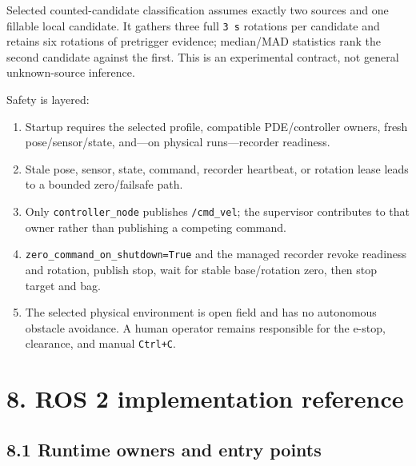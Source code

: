 \documentclass[
  10pt,
  letterpaper,
]{article}
\providecommand{\tightlist}{%
  \setlength{\itemsep}{0pt}\setlength{\parskip}{0pt}}
\begin{document}
Selected counted-candidate classification assumes exactly two sources and one
fillable local candidate. It gathers three full \texttt{3 s} rotations per candidate
and retains six rotations of pretrigger evidence; median/MAD statistics rank
the second candidate against the first. This is an experimental contract, not
general unknown-source inference.

Safety is layered:

\begin{enumerate}
\def\labelenumi{\arabic{enumi}.}
\tightlist
\item
  Startup requires the selected profile, compatible PDE/controller owners,
  fresh pose/sensor/state, and---on physical runs---recorder readiness.
\item
  Stale pose, sensor, state, command, recorder heartbeat, or rotation lease
  leads to a bounded zero/failsafe path.
\item
  Only \nolinkurl{controller\_node} publishes \nolinkurl{/cmd\_vel}; the supervisor contributes to
  that owner rather than publishing a competing command.
\item
  \nolinkurl{zero\_command\_on\_shutdown=True} and the managed recorder revoke readiness
  and rotation, publish stop, wait for stable base/rotation zero, then stop
  target and bag.
\item
  The selected physical environment is open field and has no autonomous
  obstacle avoidance. A human operator remains responsible for the e-stop,
  clearance, and manual \nolinkurl{Ctrl+C}.
\end{enumerate}

\section{8. ROS 2 implementation reference}\label{ros-2-implementation-reference}

\subsection{8.1 Runtime owners and entry points}\label{runtime-owners-and-entry-points}
\end{document}
